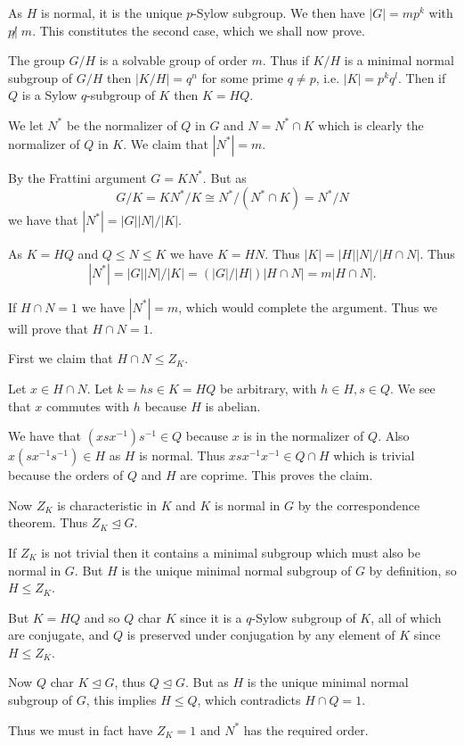 \documentclass[10pt]{article}
\newenvironment{proof}[1][Proof]{\begin{trivlist}
\item[\hskip \labelsep {\itshape #1}]}{\end{trivlist}}
\begin{document}
\begin{proof}
As $H$ is normal, it is the unique $p$-Sylow subgroup. We then have $|G| = mp^k$ with $p \not |\; m$. This constitutes the second case, which we shall now prove.

The group $G/H$ is a solvable group of order $m$. Thus if $K/H$ is a minimal normal subgroup of $G/H$ then $|K/H| = q^n$ for some prime $q \neq p$, i.e. $|K| = p^kq^l$. Then if $Q$ is a Sylow $q$-subgroup of $K$ then $K = HQ$.

We let $N^*$ be the normalizer of $Q$ in $G$ and $N = N^*\cap K$ which is clearly the normalizer of $Q$ in $K$. We claim that $|N^*| = m$.

By the Frattini argument $G = KN^*$. But as
$$G/K = KN^*/K \cong N^*/(N^*\cap K) = N^*/N$$
we have that $|N^*| = |G||N|/|K|$.

As $K = HQ$ and $Q \leq N \leq K$ we have $K = HN$. Thus $|K| = |H||N|/|H\cap N|$. Thus
$$|N^*| = |G||N|/|K| = (|G|/|H|)|H\cap N| = m|H\cap N|.$$

If $H\cap N = 1$ we have $|N^*| = m$, which would complete the argument. Thus we will prove that $H\cap N = 1$.

First we claim that $H\cap N \leq Z_K$.

Let $x \in H\cap N$. Let $k = hs \in K = HQ$ be arbitrary, with $h \in H, s \in Q$. We see that $x$ commutes with $h$ because $H$ is abelian.

We have that $(xsx^{-1})s^{-1} \in Q$ because $x$ is in the normalizer of $Q$. Also $x(sx^{-1}s^{-1}) \in H$ as $H$ is normal. Thus $xsx^{-1}x^{-1} \in Q\cap H$ which is trivial because the orders of $Q$ and $H$ are coprime. This proves the claim.

Now $Z_K$ is characteristic in $K$ and $K$ is normal in $G$ by the correspondence theorem. Thus $Z_K \mathrel{\unlhd} G$.

If $Z_K$ is not trivial then it contains a minimal subgroup which must also be normal in $G$. But $H$ is the unique minimal normal subgroup of $G$ by definition, so $H \leq Z_K$.

But $K = HQ$ and so $Q$ char $K$ since it is a $q$-Sylow subgroup of $K$, all of which are conjugate, and $Q$ is preserved under conjugation by any element of $K$ since $H \leq Z_K$.

Now $Q$ char $K \mathrel{\unlhd} G$, thus $Q \mathrel{\unlhd} G$. But as $H$ is the unique minimal normal subgroup of $G$, this implies $H \leq Q$, which contradicts $H\cap Q = 1$.

Thus we must in fact have $Z_K = 1$ and $N^*$ has the required order.


\end{proof}
\end{document}
